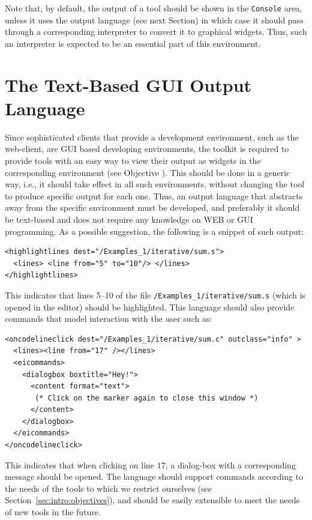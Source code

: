 %
Note that, by default, the output of a tool should be shown in the
\texttt{Console} area, unless it uses the \ei output language (see
next Section) in which case it should pass through a corresponding
interpreter to convert it to graphical widgets. Thus, such an
interpreter is expected to be an essential part of this environment.


\section{The Text-Based GUI Output Language}
\label{sec:architecture:eiol}

Since sophisticated clients that provide a development environment,
such as the web-client, are GUI based developing environments, the \ei
toolkit is required to provide tools with an easy way to view their
output as widgets in the corresponding environment (see Objective
). This should be done in a generic way, i.e., it
should take effect in all such environments, without changing the tool
to produce specific output for each one. Thus, an output language that
abstracts away from the specific environment must be developed, and
preferably it should be text-based and does not require any knowledge
on WEB or GUI programming.
%
As a possible suggestion, the following is a snippet of such output:

\medskip
\begin{lstlisting}
<highlightlines dest="/Examples_1/iterative/sum.s"> 
  <lines> <line from="5" to="10"/> </lines>
</highlightlines>
\end{lstlisting}
%

\medskip
\noindent
This indicates that lines 5--10 of the file
\texttt{/Examples\_1/iterative/sum.s} (which is opened in the editor)
should be highlighted. This language should also provide commands that
model interaction with the user such as:

\medskip
\begin{lstlisting}
<oncodelineclick dest="/Examples_1/iterative/sum.c" outclass="info" >
  <lines><line from="17" /></lines>
  <eicommands>
    <dialogbox boxtitle="Hey!"> 
      <content format="text">
       (* Click on the marker again to close this window *)
      </content>
    </dialogbox>
  </eicommands>
</oncodelineclick>
\end{lstlisting}

\medskip
\noindent
This indicates that when clicking on line $17$, a dialog-box with a
corresponding message should be opened.
%
The language should support commands according to the needs of the
tools to which we restrict ourselves (see
Section~\ref{sec:intro:objectives}), and should be easily extensible
to meet the needs of new tools in the future.
